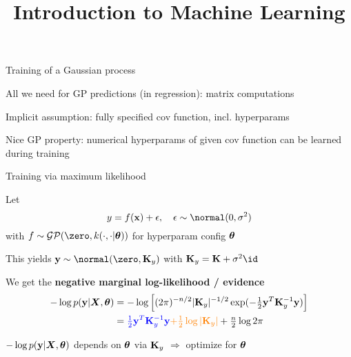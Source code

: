 \documentclass[11pt,compress,t,notes=noshow, xcolor=table]{beamer}
\title{Introduction to Machine Learning}
\begin{document}

\begin{framei}[sep=L]{Training of a Gaussian process}
\item All we need for GP predictions (in regression): matrix computations
\item Implicit assumption: fully specified cov function, incl. hyperparams
\item Nice GP property: numerical hyperparams of given cov function can be learned during training
\end{framei}

\begin{framei}[sep=L]{Training via maximum likelihood}
\item Let $$y = \fx + \epsilon, \quad \epsilon \sim \normal(0, \sigma^2)$$
with $f \sim \mathcal{GP}(\zero, k(\cdot, \cdot | \thetav))$ for hyperparam config $\bm{\theta}$
\item This yields $\yv \sim \normal(\zero, \Kmat_y )$ with  $\Kmat_y = \Kmat + \sigma^2 \id$
\item We get the \textbf{negative marginal log-likelihood / evidence}
\begin{eqnarray*}
-\log p(\mathbf{y} | \bm{X}, \bm{\theta}) &= -\log \left[(2 \pi )^{-n / 2} |\mathbf{K}_y|^{-1 / 2} \exp(- \tfrac{1}{2} \mathbf{y}^T \mathbf{K}_y^{-1} \mathbf{y}) \right] \\
&= \textcolor{blue}{\tfrac{1}{2} \mathbf{y}^T \mathbf{K}_y^{-1} \mathbf{y}} \textcolor{orange}{+ \tfrac{1}{2} \log | \mathbf{K}_y |}  + \tfrac{n}{2} \log 2 \pi
\end{eqnarray*}
\item $-\log p(\mathbf{y} | \bm{X}, \bm{\theta})$ depends on $\bm{\theta}$ via $\mathbf{K}_y$ $\Rightarrow$ optimize for $\bm{\theta}$
\end{framei}
\end{document}
